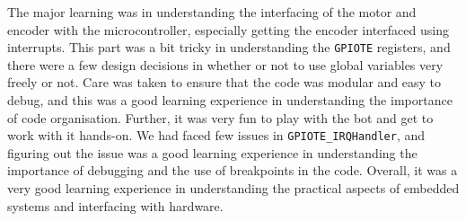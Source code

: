 The major learning was in understanding the interfacing of the motor and encoder with the microcontroller, especially getting the encoder interfaced using interrupts.
This part was a bit tricky in understanding the \texttt{GPIOTE} registers, and there were a few design decisions in whether or not to use global variables very freely or not.
Care was taken to ensure that the code was modular and easy to debug, and this was a good learning experience in understanding the importance of code organisation.
Further, it was very fun to play with the bot and get to work with it hands-on.
We had faced few issues in \texttt{GPIOTE\_IRQHandler}, and figuring out the issue was a good learning experience in understanding the importance of debugging and the use of breakpoints in the code.
Overall, it was a very good learning experience in understanding the practical aspects of embedded systems and interfacing with hardware.
